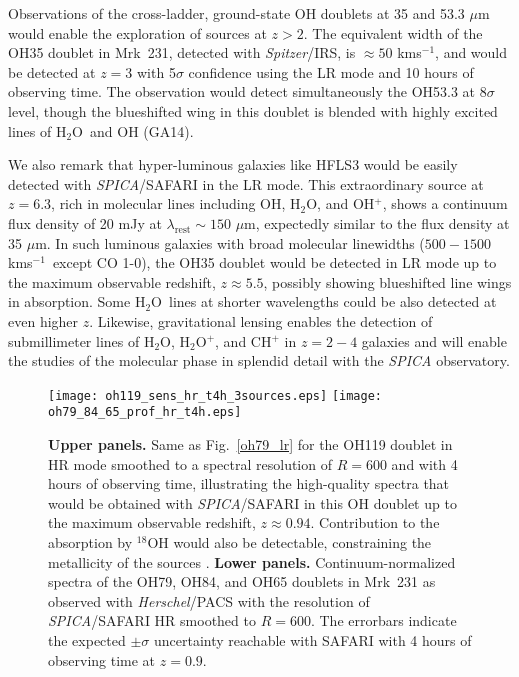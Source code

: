 \documentclass{pasa}%
\newcommand{\kms}{{\hbox {km\thinspace s$^{-1}$}}}
\newcommand{\Lsun}{{\hbox {L$_\odot$}}}
\newcommand{\hdo}{{\hbox {H$_{2}$O}}}
\begin{document}
Observations of the cross-ladder, ground-state OH doublets at 35 and 53.3
$\mu$m would enable the exploration of sources at $z>2$. The equivalent width
of the OH35 doublet in Mrk~231, detected with {\it Spitzer}/IRS, is
$\approx50$ \kms, and would be detected at $z=3$ with 5$\sigma$ confidence
using the LR mode and 10 hours of observing time. The observation would detect
simultaneously the OH53.3 at 8$\sigma$ level, though the blueshifted wing in
this doublet is blended with highly excited lines of \hdo\ and OH (GA14).

We also remark that hyper-luminous galaxies like HFLS3 
\citep[$L_{\mathrm{FIR}}\sim3\times10^{13}$ \Lsun][]{rie13}
would be easily detected with {\it SPICA}/SAFARI in the LR mode. This
extraordinary source at $z=6.3$, rich in molecular lines including OH, H$_2$O,
and OH$^+$, shows a continuum flux density of 20 mJy at
$\lambda_{\mathrm{rest}}\sim150$ $\mu$m, expectedly similar to the flux
density at 35 $\mu$m. In such luminous galaxies with broad molecular
linewidths ($500-1500$ \kms\ except CO 1-0), the OH35 doublet would be
detected in LR mode up to the maximum observable redshift,
$z\approx5.5$, possibly showing blueshifted line wings in absorption. 
Some \hdo\ lines at shorter wavelengths could be also detected at even higher
$z$. Likewise, gravitational lensing enables the detection of
submillimeter lines of H$_2$O, H$_2$O$^+$, and CH$^+$ in $z=2-4$ galaxies
\citep{omo11,omo13,yan13,yan16,falg15} and will enable the 
studies of the molecular phase in splendid detail with the 
{\it SPICA} observatory.



\begin{figure*}
\begin{center}
\texttt{[image: oh119\_sens\_hr\_t4h\_3sources.eps]}
\texttt{[image: oh79\_84\_65\_prof\_hr\_t4h.eps]}
\caption{{\bf Upper panels.}
Same as Fig.~\ref{oh79_lr} for the OH119 doublet in HR mode smoothed to a
spectral resolution of $R=600$ and with 4 hours of observing time,
illustrating the high-quality spectra that would be obtained 
with {\it SPICA}/SAFARI in this OH
doublet up to the maximum observable redshift, $z\approx0.94$.
Contribution to the absorption by $^{18}$OH would also be detectable,
constraining the metallicity of the sources \citep[see also the companion
paper][]{fer17}.
{\bf Lower panels.} Continuum-normalized spectra of the OH79, OH84, and OH65
doublets in Mrk~231 as observed with {\it Herschel}/PACS with the
resolution of {\it SPICA}/SAFARI HR smoothed to $R=600$. The errorbars
indicate the expected $\pm\sigma$ uncertainty reachable with SAFARI with 4
hours of observing time at $z=0.9$.
} 
\label{oh119_hr}
\end{center}
\end{figure*}
\end{document}
